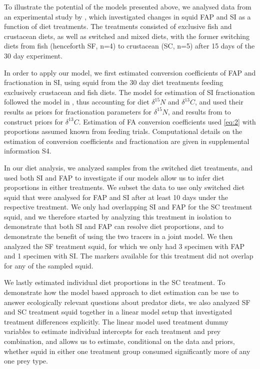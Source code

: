 \documentclass{article}%
\begin{document}
\begin{spacing}{1.9}
\begin{flushleft}
To illustrate the potential of the models presented above, we analysed
data from an experimental study by
\citet{stowasser_experimental_2006}, which investigated changes in
squid FAP and SI as a function of diet treatments. The treatments consisted of
exclusive fish and crustacean diets, as well as switched and mixed
diets, with the former switching diets from fish (henceforth SF, n=4) to
crustacean (SC, n=5) after 15 days of the 30 day experiment. 

In order to apply our model, we first estimated conversion
coefficients of FAP and fractionation in SI, using squid from the 30
day diet treatments feeding exclusively crustacean and fish diets. The
model for estimation of SI fractionation followed the model in
\citet{hussey_rescaling_2014}, thus accounting for diet $\delta^{15}N$
and $\delta^{13}C$, and used their results as priors for fractionation
parameters for $\delta^{15}N$, and results from \citet{caut_variation_2009} to
construct priors for $\delta^{13}C$. Estimation of FA conversion coefficients used
 \eqref{eq:2} with proportions assumed known from feeding
 trials. Computational details on the estimation of conversion coefficients and
 fractionation are given in supplemental information S4.

In our diet analysis, we analyzed samples from the switched diet treatments, and
used both SI and FAP to investigate if our models allow us to infer diet
proportions in either treatments. We subset the data to use only
switched diet squid that were analysed for FAP and SI after at least
10 days under the respective treatment. We only had overlapping
SI and FAP for the SC treatment squid, and we therefore started by analyzing this treatment in isolation to
demonstrate that both SI and FAP can resolve diet proportions, and to
demonstrate the benefit of using the two tracers in a joint model. We
then analyzed the SF treatment squid, for which we only had 3 specimen with FAP
and 1 specimen with SI. The markers available for this treatment did
not overlap for any of the sampled squid. 

We lastly estimated individual diet proportions in the SC
treatment. To demonstrate how the model based approach to diet estimation can be
use to answer ecologically relevant questions about predator
diets, we also analyzed SF and SC treatment squid together in a linear model
setup that investigated treatment differences explicitly. The linear
model used treatment dummy variables to estimate individual intercepts
for each treatment and prey combination, and allows us to estimate,
conditional on the data and priors, whether squid in either one
treatment group consumed significantly more of any one prey type.


\end{flushleft}
\end{spacing}
\end{document}
